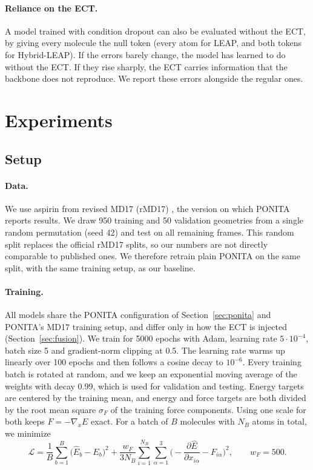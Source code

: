 \documentclass{article}
\begin{document}
\paragraph{Reliance on the ECT.}
A model trained with condition dropout can also be evaluated without the ECT, by giving every molecule the null token (every atom for LEAP, and both tokens for Hybrid-LEAP). If the errors barely change, the model has learned to do without the ECT. If they rise sharply, the ECT carries information that the backbone does not reproduce. We report these errors alongside the regular ones.

\section{Experiments}

\subsection{Setup}
\label{sec:exp-setup}

\paragraph{Data.}
We use aspirin from revised MD17 (rMD17) \citep{christensen2020rmd17}, the version on which PONITA reports results. We draw 950 training and 50 validation geometries from a single random permutation (seed 42) and test on all remaining frames. This random split replaces the official rMD17 splits, so our numbers are not directly comparable to published ones. We therefore retrain plain PONITA on the same split, with the same training setup, as our baseline.

\paragraph{Training.}
All models share the PONITA configuration of Section~\ref{sec:ponita} and PONITA's MD17 training setup, and differ only in how the ECT is injected (Section~\ref{sec:fusion}). We train for 5000 epochs with Adam, learning rate $5\cdot10^{-4}$, batch size 5 and gradient-norm clipping at 0.5. The learning rate warms up linearly over 100 epochs and then follows a cosine decay to $10^{-6}$. Every training batch is rotated at random, and we keep an exponential moving average of the weights with decay 0.99, which is used for validation and testing. Energy targets are centered by the training mean, and energy and force targets are both divided by the root mean square $\sigma_F$ of the training force components. Using one scale for both keeps $F = -\nabla_x E$ exact. For a batch of $B$ molecules with $N_B$ atoms in total, we minimize
\begin{equation}
  \mathcal L = \frac1B\sum_{b=1}^B \big(\hat E_b - E_b\big)^2 + \frac{w_F}{3N_B}\sum_{i=1}^{N_B}\sum_{\alpha=1}^3 \Big(-\frac{\partial\hat E}{\partial x_{i\alpha}} - F_{i\alpha}\Big)^2, \qquad w_F = 500.
  \label{eq:loss}
\end{equation}
\end{document}
